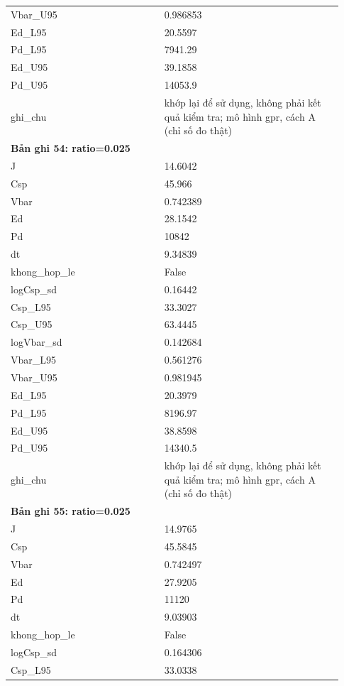 \begin{longtable}{p{0.43\linewidth}p{0.50\linewidth}}
Vbar\_\allowbreak U95 & 0.986853 \\
Ed\_\allowbreak L95 & 20.5597 \\
Pd\_\allowbreak L95 & 7941.29 \\
Ed\_\allowbreak U95 & 39.1858 \\
Pd\_\allowbreak U95 & 14053.9 \\
ghi\_\allowbreak chu & khớp lại để sử dụng, không phải kết quả kiểm tra; mô hình gpr, cách A (chỉ số đo thật) \\
\midrule
\multicolumn{2}{p{0.95\linewidth}}{\textbf{Bản ghi 54: ratio=0.025}} \\
J & 14.6042 \\
Csp & 45.966 \\
Vbar & 0.742389 \\
Ed & 28.1542 \\
Pd & 10842 \\
dt & 9.34839 \\
khong\_\allowbreak hop\_\allowbreak le & False \\
logCsp\_\allowbreak sd & 0.16442 \\
Csp\_\allowbreak L95 & 33.3027 \\
Csp\_\allowbreak U95 & 63.4445 \\
logVbar\_\allowbreak sd & 0.142684 \\
Vbar\_\allowbreak L95 & 0.561276 \\
Vbar\_\allowbreak U95 & 0.981945 \\
Ed\_\allowbreak L95 & 20.3979 \\
Pd\_\allowbreak L95 & 8196.97 \\
Ed\_\allowbreak U95 & 38.8598 \\
Pd\_\allowbreak U95 & 14340.5 \\
ghi\_\allowbreak chu & khớp lại để sử dụng, không phải kết quả kiểm tra; mô hình gpr, cách A (chỉ số đo thật) \\
\midrule
\multicolumn{2}{p{0.95\linewidth}}{\textbf{Bản ghi 55: ratio=0.025}} \\
J & 14.9765 \\
Csp & 45.5845 \\
Vbar & 0.742497 \\
Ed & 27.9205 \\
Pd & 11120 \\
dt & 9.03903 \\
khong\_\allowbreak hop\_\allowbreak le & False \\
logCsp\_\allowbreak sd & 0.164306 \\
Csp\_\allowbreak L95 & 33.0338 \\

\end{longtable}
